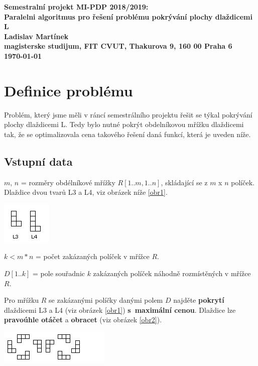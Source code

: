 \documentclass[]{article}
\begin{document}
\begin{center}
\bf Semestralní projekt MI-PDP 2018/2019:\\[5mm]
    Paralelni algoritmus pro řešení problému pokrývání plochy dlaždicemi L\\[5mm] 
       Ladislav Martínek\\[2mm]
magisterske studijum, FIT CVUT, Thakurova 9, 160 00 Praha 6\\[2mm]
\today
\end{center}

\section{Definice problému}

Problém, který jsme měli v ráncí semestrálního projektu řešit se týkal pokrývání plochy dlaždicemi L. Tedy bylo nutné pokrýt obdelníkovou mřížku dlaždicemi tak, že se optimalizovala cena takového řešení daná funkcí, která je uveden níže. 


\subsection{Vstupní data}
$m$, $n$ = rozměry obdélníkové mřížky $R[1..m,1..n]$, skládající se z $m$ x $n$ políček.
Dlaždice dvou tvarů L3 a L4, viz obrázek níže \ref{obr1}.

\begin{center}
 \includegraphics{ll.png}
 \label{obr1}
\end{center}

\noindent
$k <m*n $ = počet zakázaných políček v mřížce $R$.

\noindent
$D[1..k]$ = pole souřadnic $k$ zakázaných políček náhodně rozmístěných v mřížce $R$.

\noindent
Pro mřížku $R$ se zakázanými políčky danými polem $D$ najděte \textbf{pokrytí}  dlaždicemi L3 a L4 (viz obrázek \ref{obr1}) \textbf{s~maximální cenou}.
Dlaždice lze \textbf{pravoúhle otáčet} a \textbf{obracet} (viz obrázek \ref{obr2}).

\begin{center}
    \includegraphics{l2.png}
     \label{obr2}
    \end{center}
  
\end{document}
